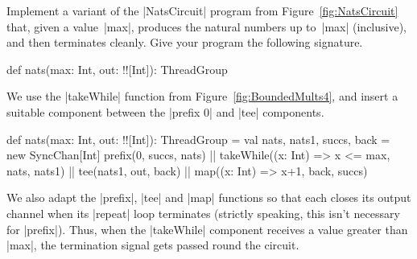 \begin{questionS}
Implement a variant of the |NatsCircuit| program from
Figure~\ref{fig:NatsCircuit} that, given a value~|max|, produces the natural
numbers up to~|max| (inclusive), and then terminates cleanly.  Give your
program the following signature. 
%
\begin{scala}
  def nats(max: Int, out: !![Int]): ThreadGroup 
\end{scala}
\end{questionS}

\begin{answerS}
We use the |takeWhile| function from Figure~\ref{fig:BoundedMults4}, and
insert a suitable component between the |prefix 0| and |tee| components.  
\begin{scala}
  def nats(max: Int, out: !![Int]): ThreadGroup = {
    val nats, nats1, succs, back = new SyncChan[Int]
    prefix(0, succs, nats) || takeWhile((x: Int) => x <= max, nats, nats1) ||
      tee(nats1, out, back) || map((x: Int) => x+1, back, succs)
  }
\end{scala}
We also adapt the |prefix|, |tee| and |map| functions so that each closes its
output channel when its |repeat| loop terminates (strictly speaking, this
isn't necessary for |prefix|).  Thus, when the |takeWhile| component receives
a value greater than |max|, the termination signal gets passed round the
circuit.
\end{answerS}





